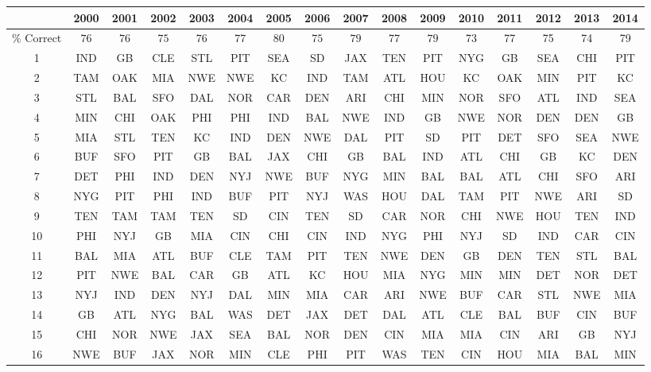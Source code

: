 \documentclass[11pt]{article}
\begin{document}
\begin{table}[!htb]
\begin{center}
\scriptsize
\begin{tabular}{|c|c|c|c|c|c|c|c|c|c|c|c|c|c|c|c|}
\hline
 & 2000 & 2001 & 2002 & 2003 & 2004 & 2005 & 2006 & 2007 & 2008 & 2009 & 2010 & 2011 & 2012 & 2013 & 2014\\
\hline
$\%$ Correct & $76$ & $76$ & $75$ & $76$ & $77$ & $80$ & $75$ & $79$ & $77$ & $79$ & 73 & 77 & 75 & 74 & 79\\
1 & IND & GB & CLE & STL & PIT & SEA & SD & JAX & TEN & PIT & NYG & GB & SEA & CHI & PIT\\
2 & TAM & OAK & MIA & NWE & NWE & KC & IND & TAM & ATL & HOU & KC & OAK & MIN & PIT & KC\\
3 & STL & BAL & SFO & DAL & NOR & CAR & DEN & ARI & CHI & MIN & NOR & SFO & ATL & IND & SEA\\
4 & MIN & CHI & OAK & PHI & PHI & IND & BAL & NWE & IND & GB & NWE & NOR & DEN & DEN & GB\\
5 & MIA & STL & TEN & KC & IND & DEN & NWE & DAL & PIT & SD & PIT & DET & SFO & SEA & NWE\\
6 & BUF & SFO & PIT & GB & BAL & JAX & CHI & GB & BAL & IND & ATL & CHI & GB & KC & DEN\\
7 & DET & PHI & IND & DEN & NYJ & NWE & BUF & NYG & MIN & BAL & BAL & ATL & CHI & SFO & ARI\\
8 & NYG & PIT & PHI & IND & BUF & PIT & NYJ & WAS & HOU & DAL & TAM & PIT & NWE & ARI & SD\\
9 & TEN & TAM & TAM & TEN & SD & CIN & TEN & SD & CAR & NOR & CHI & NWE & HOU & TEN & IND\\
10 & PHI & NYJ & GB & MIA & CIN & CHI & CIN & IND & NYG & PHI & NYJ & SD & IND & CAR & CIN\\
11 & BAL & MIA & ATL & BUF & CLE & TAM & PIT & TEN & NWE & DEN & GB & DEN & TEN & STL & BAL\\
12 & PIT & NWE & BAL & CAR & GB & ATL & KC & HOU & MIA & NYG & MIN & MIN & DET & NOR & DET\\
13 & NYJ & IND & DEN & NYJ & DAL & MIN & MIA & CAR & ARI & NWE & BUF & CAR & STL & NWE & MIA\\
14 & GB & ATL & NYG & BAL & WAS & DET & JAX & DET & DAL & ATL & CLE & BAL & BUF & CIN & BUF\\
15 & CHI & NOR & NWE & JAX & SEA & BAL & NOR & DEN & CIN & MIA & MIA & CIN & ARI & GB & NYJ\\
16 & NWE & BUF & JAX & NOR & MIN & CLE & PHI & PIT & WAS & TEN & CIN & HOU & MIA & BAL & MIN\\

\end{tabular}
\end{center}
\end{table}
\end{document}

